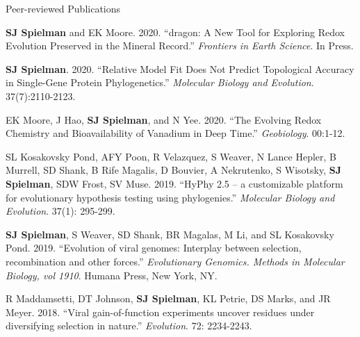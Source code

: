 \documentclass{resume} %
\begin{document}
\vspace*{0.35cm}
\begin{rSection}{Peer-reviewed Publications}
\vspace*{0.25cm}

\begin{etaremune}[leftmargin=1.5em]

\item \textbf{SJ Spielman} and EK Moore. 2020. ``dragon: A New Tool for Exploring Redox Evolution Preserved in the Mineral Record.'' \emph{Frontiers in Earth Science}. In Press.

\item \textbf{SJ Spielman}. 2020. ``Relative Model Fit Does Not Predict Topological Accuracy in Single-Gene Protein Phylogenetics.'' \emph{Molecular Biology and Evolution}. 37(7):2110-2123.

\item EK Moore, J Hao, \textbf{SJ Spielman}, and N Yee. 2020. ``The Evolving Redox Chemistry and Bioavailability of Vanadium in Deep Time.'' \emph{Geobiology}. 00:1-12.

\item SL Kosakovsky Pond, AFY Poon, R Velazquez, S Weaver, N Lance Hepler, B Murrell, SD Shank, B Rife Magalis, D Bouvier, A Nekrutenko, S Wisotsky, \textbf{SJ Spielman}, SDW Frost, SV Muse. 2019. ``HyPhy 2.5 – a customizable platform for evolutionary hypothesis testing using phylogenies.'' \emph{Molecular Biology and Evolution}. 37(1): 295-299.

\item \textbf{SJ Spielman}, S Weaver, SD Shank, BR Magalas, M Li, and SL Kosakovsky Pond. 2019. ``Evolution of viral genomes: Interplay between selection, recombination and other forces.'' \emph{Evolutionary Genomics. Methods in Molecular Biology, vol 1910}. Humana Press, New York, NY.

\item R Maddamsetti, DT Johnson, \textbf{SJ Spielman}, KL Petrie, DS Marks, and JR Meyer. 2018. ``Viral gain-of-function experiments uncover residues under diversifying selection in nature.'' \emph{Evolution}. 72: 2234-2243.


\end{etaremune}
\end{rSection}
\end{document}
